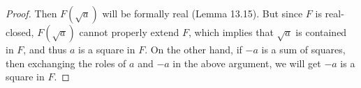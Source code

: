 \documentclass{article}
\begin{document}
\begin{enumerate}[label={\bf Q\arabic*:}]
\begin{proof}
      Then $F(\sqrt{a})$ will be formally real (Lemma 13.15). But since $F$
      is real-closed, $F(\sqrt{a})$ cannot properly extend $F$, which
      implies that $\sqrt{a}$ is contained in $F$, and thus $a$ is a square
      in $F$. On the other hand, if $-a$ is a sum of squares, then
      exchanging the roles of $a$ and $-a$ in the above argument, we will
      get $-a$ is a square in $F$.
    \end{proof}
\end{enumerate}
\end{document}
